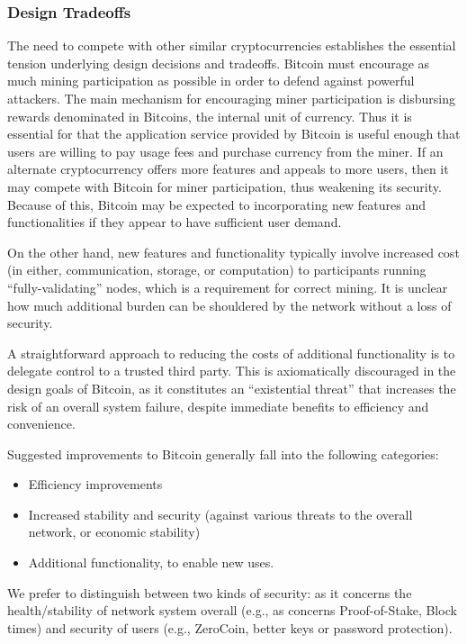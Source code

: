 \subsubsection{Design Tradeoffs}
The need to compete with other similar cryptocurrencies establishes the essential tension underlying design decisions and tradeoffs. Bitcoin must encourage as much mining participation as possible in order to defend against powerful attackers. The main mechanism for encouraging miner participation is disbursing rewards denominated in Bitcoins, the internal unit of currency. Thus it is essential for that the application service provided by Bitcoin is useful enough that users are willing to pay usage fees and purchase currency from the miner. If an alternate cryptocurrency offers more features and appeals to more users, then it may compete with Bitcoin for miner participation, thus weakening its security. Because of this, Bitcoin may be expected to incorporating new features and functionalities if they appear to have sufficient user demand.

On the other hand, new features and functionality typically involve increased cost (in either, communication, storage, or computation) to participants running ``fully-validating'' nodes, which is a requirement for correct mining. It is unclear how much additional burden can be shouldered by the network without a loss of security.

A straightforward approach to reducing the costs of additional functionality is to delegate control to a trusted third party. This is axiomatically discouraged in the design goals of Bitcoin, as it constitutes an ``existential threat'' that increases the risk of an overall system failure, despite immediate benefits to efficiency and convenience.

Suggested improvements to Bitcoin generally fall into the following categories:
\begin{itemize}
\item Efficiency improvements
\item Increased stability and security (against various threats to the overall network, or economic stability)
\item Additional functionality, to enable new uses.
\end{itemize}

We prefer to distinguish between two kinds of security: as it concerns the health/stability of network system overall (e.g., as concerns Proof-of-Stake, Block times) and security of users (e.g., ZeroCoin, better keys or password protection).

